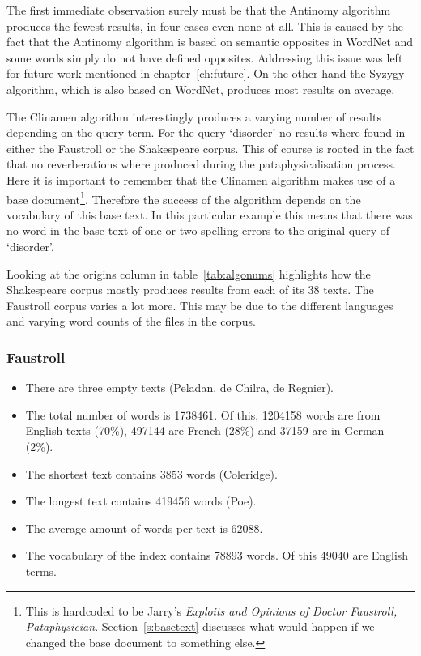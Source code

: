 The first immediate observation surely must be that the Antinomy algorithm produces the fewest results, in four cases even none at all. This is caused by the fact that the Antinomy algorithm is based on semantic opposites in WordNet and some words simply do not have defined opposites. Addressing this issue was left for future work mentioned in chapter~\ref{ch:future}. On the other hand the Syzygy algorithm, which is also based on WordNet, produces most results on average.

The Clinamen algorithm interestingly produces a varying number of results depending on the query term. For the query `disorder' no results where found in either the Faustroll or the Shakespeare corpus. This of course is rooted in the fact that no reverberations where produced during the pataphysicalisation process. Here it is important to remember that the Clinamen algorithm makes use of a base document\footnote{This is hardcoded to be Jarry's \textit{Exploits and Opinions of Doctor Faustroll, Pataphysician}. Section~\ref{s:basetext} discusses what would happen if we changed the base document to something else.}. Therefore the success of the algorithm depends on the vocabulary of this base text. In this particular example this means that there was no word in the base text of one or two spelling errors to the original query of `disorder'.

Looking at the origins column in table~\ref{tab:algonums} highlights how the Shakespeare corpus mostly produces results from each of its 38 texts. The Faustroll corpus varies a lot more. This may be due to the different languages and varying word counts of the files in the corpus.

\subsubsection{Faustroll}
\label{s:fauststats}
\begin{itemize}
  \item There are three empty texts (Peladan, de Chilra, de Regnier).
  \item The total number of words is \num{1738461}. Of this, \num{1204158} words are from English texts (70\%), \num{497144} are French (28\%) and \num{37159} are in German (2\%).
  \item The shortest text contains \num{3853} words (Coleridge).
  \item The longest text contains \num{419456} words (Poe).
  \item The average amount of words per text is \num{62088}.
  \item The vocabulary of the index contains \num{78893} words. Of this \num{49040} are English terms.
\end{itemize}

